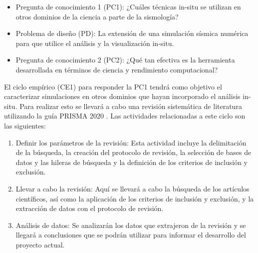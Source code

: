 \begin{itemize}
    \item Pregunta de conocimiento 1 (PC1): ¿Cuáles técnicas in-situ se utilizan en otros dominios de la ciencia a parte de la sismología?
    \item Problema de diseño (PD): La extensión de una simulación sísmica numérica para que utilice el análisis y la visualización in-situ.
    \item Pregunta de conocimiento 2 (PC2): ¿Qué tan efectiva es la herramienta desarrollada en términos de ciencia y rendimiento computacional?
\end{itemize}

El ciclo empírico (CE1) para responder la PC1 tendrá como objetivo el caracterizar simulaciones en otros dominios que hayan incorporado el análisis in-situ. Para realizar esto se llevará a cabo una revisión sistemática de literatura utilizando la guía PRISMA 2020 \cite{Page2021}. 
Las actividades relacionadas a este ciclo son las siguientes:
\begin{enumerate}
    \item Definir los parámetros de la revisión: Esta actividad incluye la delimitación de la búsqueda, la creación del protocolo de revisión, la selección de bases de datos y las hileras de búsqueda y la definición de los criterios de inclusión y exclusión.
    \item Llevar a cabo la revisión: Aquí se llevará a cabo la búsqueda de los artículos científicos, así como la aplicación de los criterios de inclusión y exclusión, y la extracción de datos con el protocolo de revisión.
    \item Análisis de datos: Se analizarán los datos que extrajeron de la revisión y se llegará a conclusiones que se podrán utilizar para informar el desarrollo del proyecto actual.
    \setcounter{tasks}{\value{enumi}}
\end{enumerate}

